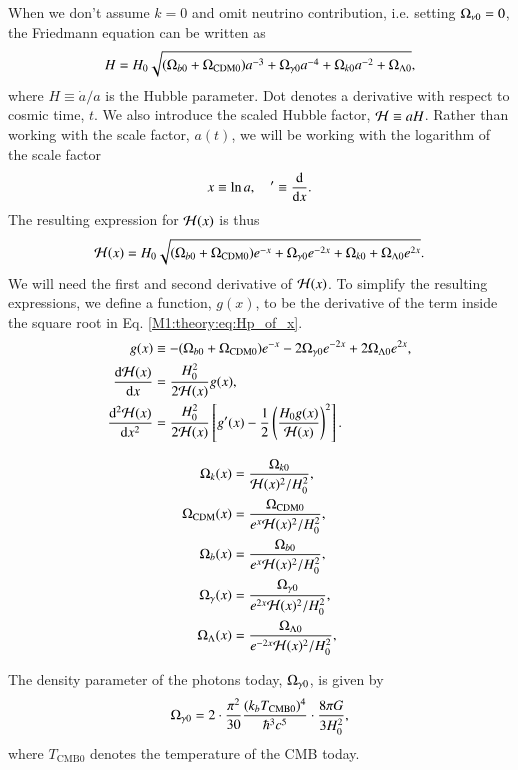 When we don't assume $k=0$ and omit neutrino contribution, i.e. setting $\Omega_{\nu 0}=0$, the Friedmann equation can be written as 
\begin{equation}
    H = H_0 \sqrt{(\Omega_{b0} + \Omega_\mathrm{CDM0})a^{-3} + \Omega_{\gamma 0} a^{-4} + \Omega_{k0} a^{-2} + \Omega_{\Lambda 0}}, \label{M1:theory:eq:Friedmann_H_omegas}
\end{equation}
where $H\equiv\dot{a}/a$ is the Hubble parameter. Dot denotes a derivative with respect to cosmic time, $t$. We also introduce the scaled Hubble factor, $\mathcal{H}\equiv aH$. Rather than working with the scale factor, $a(t)$, we will be working with the logarithm of the scale factor 
\begin{equation} \label{M1:theory:eq:x_dx_definitions}
    x\equiv \ln a,\quad '\equiv \dv{x}. 
\end{equation}
%
%
The resulting expression for $\mathcal{H}(x)$ is thus  
\begin{equation} \label{M1:theory:eq:Hp_of_x}
    \mathcal{H}(x) = H_0 \sqrt{(\Omega_{b0} + \Omega_\mathrm{CDM0})e^{-x} + \Omega_{\gamma 0} e^{-2x} + \Omega_{k0} + \Omega_{\Lambda 0} e^{2x}}. 
\end{equation}
%
%
We will need the first and second derivative of $\mathcal{H}(x)$. To simplify the resulting expressions, we define a function, $g(x)$, to be the derivative of the term inside the square root in Eq. \eqref{M1:theory:eq:Hp_of_x}. 
%
\begin{align} 
    g(x) & \equiv -(\Omega_{b0}+\Omega_\mathrm{CDM0}) e^{-x} -2\Omega_{\gamma 0} e^{-2x} + 2\Omega_{\Lambda 0} e^{2x}, \label{M1:theory:eq:g_of_x} \\ 
    \dv{\mathcal{H}(x)}{x} &= \frac{H_0^2}{2\mathcal{H}(x)}g(x), \label{M1:theory:eq:dHp_dx} \\
    \dv[2]{\mathcal{H}(x)}{x} &= \frac{H_0^2}{2\mathcal{H}(x)}\left[ g'(x) - \frac{1}{2}\left( \frac{H_0 g(x)}{\mathcal{H}(x)} \right)^2 \right]. \label{M1:theory:eq:ddHp_ddx}
\end{align}


\begin{align}
    \Omega_{k}(x) &= \frac{\Omega_{k0}}{\mathcal{H}(x)^2 / H_0^2}, \\ 
    \Omega_\mathrm{CDM}(x) &= \frac{\Omega_\mathrm{CDM0}}{e^x \mathcal{H}(x)^2 / H_0^2}, \\ 
    \Omega_b(x) &= \frac{\Omega_{b0}}{e^x \mathcal{H}(x)^2 / H_0^2}, \\ 
    \Omega_{\gamma}(x) &= \frac{\Omega_{\gamma 0}}{e^{2x} \mathcal{H}(x)^2 / H_0^2}, \\ 
    \Omega_{\Lambda}(x) &= \frac{\Omega_{\Lambda 0}}{e^{-2x} \mathcal{H}(x)^2 / H_0^2}, \\ 
\end{align}

The density parameter of the photons today, $\Omega_{\gamma 0}$, is given by 
\begin{equation}
    \Omega_{\gamma 0} = 2 \cdot \frac{\pi^2}{30} \frac{(k_b T_\mathrm{CMB0})^4}{\hbar^3 c^5} \cdot \frac{8\pi G}{3H_0^2}, \label{M1:theory:eq:omega_gamma0_T}
\end{equation}
where $T_\mathrm{CMB0}$ denotes the temperature of the CMB today. 


